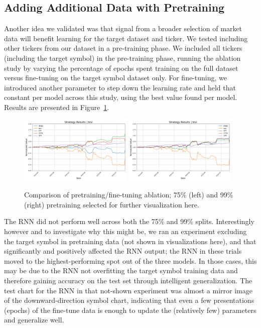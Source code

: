 \documentclass[10pt,twocolumn,letterpaper]{article}
\begin{document}
\subsection{Adding Additional Data with Pretraining}

Another idea we validated was that signal from a broader selection of market data will benefit learning for the target dataset and ticker. We tested including other tickers from our dataset in a pre-training phase. We included all tickers (including the target symbol) in the pre-training phase, running the ablation study by varying the percentage of epochs spent training on the full dataset versus fine-tuning on the target symbol dataset only. For fine-tuning, we introduced another parameter to step down the learning rate and held that constant per model across this study, using the best value found per model.  Results are presented in Figure~\ref{fig:pretrainingsplits}.

\begin{figure}[ht!]
    \centering
    \includegraphics[width=0.48\textwidth]{../figures/simulation_results_all_models_bivi_config_target_split_75.yml.png}
    \includegraphics[width=0.48\textwidth]{../figures/simulation_results_all_models_bivi_config_target_split_99.yml.png} 
    \caption{Comparison of pretraining/fine-tuning ablation; 75\% (left) and 99\% (right) pretraining selected for further visualization here.}
    \label{fig:pretrainingsplits}
\end{figure}

The RNN did not perform well across both the 75\% and 99\% splits. Interestingly however and to investigate why this might be, we ran an experiment excluding the target symbol in pretraining data (not shown in visualizations here), and that significantly and positively affected the RNN output; the RNN in these trials moved to the highest-performing spot out of the three models. In those cases, this may be due to the RNN not overfitting the target symbol training data and therefore gaining accuracy on the test set through intelligent generalization. The test chart for the RNN in that not-shown experiment was almost a mirror image of the downward-direction symbol chart, indicating that even a few presentations (epochs) of the fine-tune data is enough to update the (relatively few) parameters and generalize well. 
\end{document}
